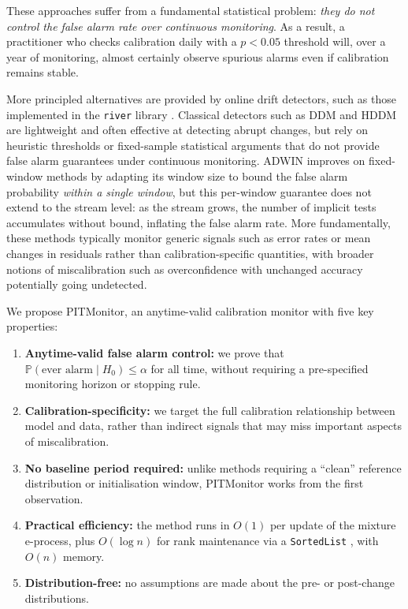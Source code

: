 \documentclass[ejsv2, noshowframe]{imsart}
\theoremstyle{plain}
\theoremstyle{definition}
\theoremstyle{remark}
\newcommand{\Prob}{\mathbb{P}}
\begin{document}
These approaches suffer from a fundamental statistical problem: \emph{they do not control the false alarm rate over continuous monitoring}. As a result, a practitioner who checks calibration daily with a $p < 0.05$ threshold will, over a year of monitoring, almost certainly observe spurious alarms even if calibration remains stable.

More principled alternatives are provided by online drift detectors, such as those implemented in the \texttt{river} library \citep{montiel2021river}. Classical detectors such as DDM and HDDM are lightweight and often effective at detecting abrupt changes, but rely on heuristic thresholds or fixed-sample statistical arguments that do not provide false alarm guarantees under continuous monitoring. ADWIN \citep{bifet2007learning} improves on fixed-window methods by adapting its window size to bound the false alarm probability \emph{within a single window}, but this per-window guarantee does not extend to the stream level: as the stream grows, the number of implicit tests accumulates without bound, inflating the false alarm rate. More fundamentally, these methods typically monitor generic signals such as error rates or mean changes in residuals rather than calibration-specific quantities, with broader notions of miscalibration such as overconfidence with unchanged accuracy potentially going undetected.

We propose PITMonitor, an anytime-valid calibration monitor with five key properties:
\begin{enumerate}
 \item \textbf{Anytime-valid false alarm control:} we prove that $\Prob(\text{ever alarm} \mid H_0) \leq \alpha$ for all time, without requiring a pre-specified monitoring horizon or stopping rule.
 
 \item \textbf{Calibration-specificity:} we target the full calibration relationship between model and data, rather than indirect signals that may miss important aspects of miscalibration.
 
 \item \textbf{No baseline period required:} unlike methods requiring a ``clean'' reference distribution or initialisation window, PITMonitor works from the first observation.

 \item \textbf{Practical efficiency:} the method runs in $O(1)$ per update of the mixture e-process, plus $O(\log n)$ for rank maintenance via a \texttt{SortedList} \citep{sortedcontainers}, with $O(n)$ memory.

 \item \textbf{Distribution-free:} no assumptions are made about the pre- or post-change distributions.
\end{enumerate}
\end{document}
